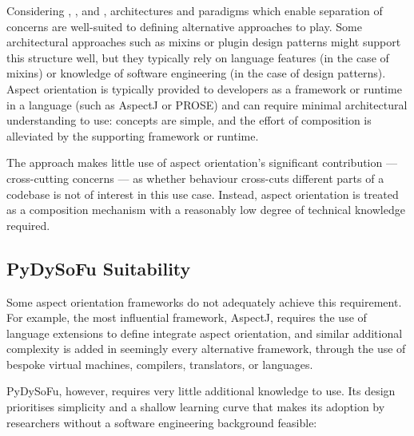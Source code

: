 Considering , , and , architectures and
paradigms which enable separation of concerns are well-suited to defining
alternative approaches to play. Some architectural approaches such as mixins or
plugin design patterns might support this structure well, but they typically
rely on language features (in the case of mixins) or knowledge of software
engineering (in the case of design patterns). Aspect orientation is typically
provided to developers as a framework or runtime in a language (such as
AspectJ\cite{aspectj_intro} or PROSE\cite{popovici2002PROSE}) and can require
minimal architectural understanding to use: concepts are simple, and the effort
of composition is alleviated by the supporting framework or runtime.

The approach makes little use of aspect orientation's significant contribution
--- cross-cutting concerns --- as whether behaviour cross-cuts different parts
of a codebase is not of interest in this use case. Instead, aspect orientation
is treated as a composition mechanism with a reasonably low degree of technical
knowledge required.

\subsection{PyDySoFu Suitability}\label{subsec:optimisation_with_aspects_usingpdsf}
Some aspect orientation frameworks do not adequately achieve this requirement.
For example, the most influential framework, AspectJ, requires the use of
language extensions to define integrate aspect
orientation\cite{AspectJLanguageAndTools}, and similar additional complexity is
added in seemingly every alternative framework, through the use of bespoke
virtual machines, compilers, translators, or
languages\cite{rajan2006nu_towardsAO_invocation,popovici2003JITaspects,AspectCplusplusDesignImpl,baker2002maya}.

PyDySoFu, however, requires very little additional knowledge to use. Its design
prioritises simplicity and a shallow learning curve that makes its adoption by
researchers without a software engineering background feasible: 

